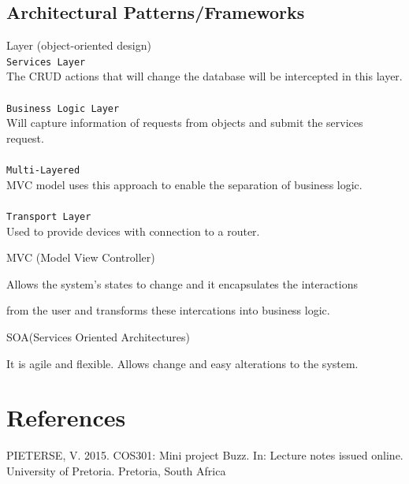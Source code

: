 \documentclass[a4paper,12pt]{report}
\begin{document}
\newpage
\subsection{Architectural Patterns/Frameworks}
	\begin{description}
\item[$\bullet$] Layer (object-oriented design)\\
\texttt{Services Layer}\\
The CRUD actions that will change the database will be intercepted in this layer. \\ \\
\texttt{Business Logic Layer}\\
Will capture information of requests from objects and submit the services request.\\ \\
\texttt{Multi-Layered}\\
MVC model uses this approach to enable the separation of business logic.\\ \\
\texttt{Transport Layer}\\
Used to provide devices with connection to a router.
\item[$\bullet$] MVC (Model View Controller)
\item Allows the system's states to change and it encapsulates the interactions
\item from the user and transforms these intercations into business logic.
\item[$\bullet$] SOA(Services Oriented Architectures)
\item It is agile and flexible. Allows change and easy alterations to the system.
\end{description}

\newpage
\section{References}
PIETERSE, V. 2015. COS301: Mini project Buzz. In: Lecture notes issued online. University of Pretoria. Pretoria, South Africa
\end{document}
